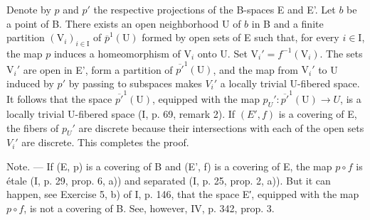 Denote by \(p\) and \(p'\) the respective projections of the B-spaces E and E'. Let \(b\) be a point of B. There exists an open neighborhood U of \(b\) in B and a finite partition \((\mathrm{V}_i)_{i\in \mathrm{I}}\) of \(\overline{p}^1 (\mathrm{U})\) formed by open sets of E such that, for every \(i\in \mathrm{I}\), the map \(p\) induces a homeomorphism of \(\mathrm{V}_i\) onto U. Set \(\mathrm{V}_i' = f^{-1}(\mathrm{V}_i)\). The sets \(\mathrm{V}_i'\) are open in E', form a partition of \(\overline{p'}^{1}(\mathrm{U})\), and the map from \(\mathrm{V}_i'\) to U induced by \(p'\) by passing to subspaces makes \(V_i'\) a locally trivial U-fibered space. It follows that the space \(\overline{p'}^{1}(\mathrm{U})\), equipped with the map \(p_U': \overline{p'}^{1}(\mathrm{U}) \to U\), is a locally trivial U-fibered space (I, p. 69, remark 2). If \((E', f)\) is a covering of E, the fibers of \(p_U'\) are discrete because their intersections with each of the open sets \(V_i'\) are discrete. This completes the proof.

Note. --- If (E, p) is a covering of B and (E', f) is a covering of E, the map \(p \circ f\) is étale (I, p. 29, prop. 6, a)) and separated (I, p. 25, prop. 2, a)). But it can happen, see Exercise 5, b) of I, p. 146, that the space E′, equipped with the map \(p \circ f\), is not a covering of B. See, however, IV, p. 342, prop. 3.

